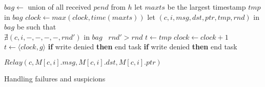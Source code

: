 \begin{algorithm}
\begin{distribalgo}[1]
\vspace{2.0mm}		
		\STATE $bag \leftarrow$ union of all received $pend$ from $h$
		\STATE let $maxts$ be the largest timestamp $tmp$ in $bag$
		\STATE $clock \leftarrow max(clock, time(maxts))$
			\STATE let $(c,i,msg,dst,ptr,tmp,rnd)$ in $bag$ be such that \\
				\hfill $\nexists (c,i,-,-,-,-,rnd')$ in $bag$ \band\ $rnd' > rnd$
				\STATE $t \leftarrow tmp$
			\ELSE
				\STATE $clock \leftarrow clock + 1$
				\STATE $t \leftarrow \langle clock,g \rangle$
			\ENDIF
				\STATE {}
				\STATE {}
				\STATE \textbf{if} write denied \textbf{then} end task
			\ENDINDENT	
		\ELSE
				\STATE {}
				\STATE \textbf{if} write denied \textbf{then} end task
			\ENDINDENT	
		\ENDIF
		\ENDINDENT
		
\ENDWHEN
\vspace{2.0mm}

		\STATE $Relay(c,M[c,i].msg,M[c,i].dst,M[c,i].ptr)$
	\ENDINDENT
\ENDWHEN
\vspace{2.0mm}

\caption{Handling failures and suspicions}
\label{alg:failures}
\end{distribalgo}
\end{algorithm}
